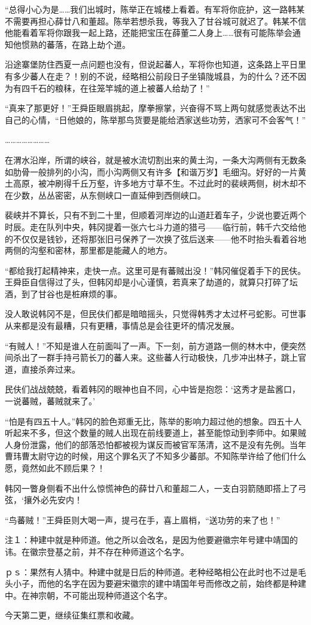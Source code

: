 “总得小心为是……我们出城时，陈举正在城楼上看着。有军将你庇护，这一路韩某不需要再担心薛廿八和董超。陈举若想杀我，等我入了甘谷城可就迟了。韩某不信他能看着军将你跟我一起上路，还能把宝压在薛董二人身上……很有可能陈举会通知他惯熟的蕃落，在路上劫个道。

沿途寨堡防住西夏一点问题也没有，但说起蕃人，军将你也知道，这条路上平日里有多少蕃人在走？！别的不说，经略相公前段日子坐镇陇城县，为的什么？还不因为有四千石的粮秣，在往笼竿城的道上被蕃人给劫了！”

“真来了那更好！”王舜臣眼眉挑起，摩拳擦掌，兴奋得不骂上两句就感觉表达不出自己的心情，“日他娘的，陈举那鸟货要是能给洒家送些功劳，洒家可不会客气！”

……………………

在渭水沿岸，所谓的峡谷，就是被水流切割出来的黄土沟，一条大沟两侧有无数条如肋骨一般排列的小沟，而小沟两侧又有许多【和谐万岁】毛细沟。好好的一片黄土高原，被冲刷得千丘万壑，许多地方寸草不生。不过此时的裴峡两侧，树木却不在少数，丛丛密密，从东侧峡口一直延伸到西侧峡口。

裴峡并不算长，只有不到二十里，但顺着河岸边的山道赶着车子，少说也要近两个时辰。走在队列中央，韩冈提着一张六七斗力道的猎弓——临行前，韩千六交给他的不仅仅是钱钞，还将那张旧弓保养了一次换了弦后送来——他不时抬头看着谷地两侧的沟壑和密林，那里都是能藏人的地方。

“都给我打起精神来，走快一点。这里可是有蕃贼出没！”韩冈催促着手下的民伕。王舜臣自信得过了头，但韩冈却是小心谨慎，若真来了劫道的，就算只打碎了坛酒，到了甘谷也是桩麻烦的事。

没人敢说韩冈不是，但民伕们都是暗暗摇头，只觉得韩秀才太过杯弓蛇影。可世事从来都是没有最糟，只有更糟，事情总是会往更坏的情况发展。

“有贼人！”不知是谁人在前面叫了一声。下一刻，前方道路一侧的林木中，便突然间杀出了一群手持弓箭长刀的蕃人来。这些蕃人行动极快，几步冲出林子，跳上官道，直接杀奔过来。

民伕们战战兢兢，看着韩冈的眼神也自不同，心中皆是抱怨：‘这秀才是盐酱口，一说蕃贼，蕃贼就来了。’

“怕是有四五十人。”韩冈的脸色郑重无比，陈举的影响力超过他的想象。四五十人听起来不多，但这个数量的贼人出现在前线要道上，甚至能惊动到李师中。如果贼人身份泄露，他们的部落恐怕都被视为谋反而被官军荡清，这不是没有先例。当年曹玮曹太尉守边的时候，用这个罪名灭了不知多少蕃部。不知陈举许给了他们什么愿，竟然如此不顾后果？！

韩冈一瞥身侧看不出什么惊慌神色的薛廿八和董超二人，一支白羽箭随即搭上了弓弦，‘攘外必先安内！

“鸟蕃贼！”王舜臣则大喝一声，提弓在手，喜上眉梢，“送功劳的来了也！”

注１：种建中就是种师道。他之所以会改名，是因为他要避徽宗年号建中靖国的讳。在徽宗登基之前，并不存在种师道这个名字。

ｐｓ：果然有人猜中。种建中就是日后的种师道。老种经略相公在此时也不过是毛头小子，而他的名字在因为要避宋徽宗的建中靖国年号而修改之前，始终都是种建中。在神宗朝，不可能出现种师道这个名字。

今天第二更，继续征集红票和收藏。

